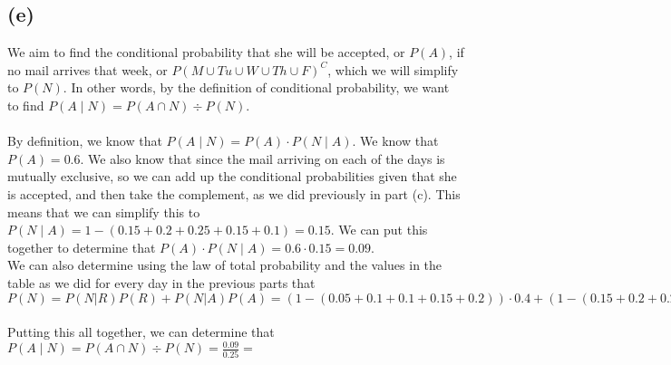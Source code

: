 \documentclass{article}
\begin{document}
{\subsection*{(e)}

We aim to find the conditional probability that she will be accepted, or $P(A)$, if no mail arrives that week, or $P(M \cup Tu \cup W \cup Th \cup F)^C$, which we will simplify to $P(N)$. In other words, by the definition of conditional probability, we want to find $P(A \mid N) = P(A \cap N) \div P(N)$. \\ \\ 
By definition, we know that $P(A \mid N) = P(A) \cdot P(N \mid A)$. We know that $P(A) = 0.6$. We also know that since the mail arriving on each of the days is mutually exclusive, so we can add up the conditional probabilities given that she is accepted, and then take the complement, as we did previously in part (c). This means that we can simplify this to $P(N \mid A) = 1 - (0.15 + 0.2 + 0.25 + 0.15 + 0.1) = 0.15$. We can put this together to determine that $P(A) \cdot P(N \mid A) = 0.6 \cdot 0.15 = 0.09$.\\ 
We can also determine using the law of total probability and the values in the table as we did for every day in the previous parts that $P(N) = P(N|R)P(R) + P(N|A)P(A) = (1 - (0.05 + 0.1 + 0.1 + 0.15 + 0.2)) \cdot 0.4 + (1 - (0.15 + 0.2 + 0.25 + 0.15 + 0.1)) \cdot 0.6 = 0.16 + 0.09 = 0.25$ \\ \\ 
Putting this all together, we can determine that $P(A \mid N) = P(A \cap N) \div P(N) = \frac{0.09}{0.25} = $ 

}
\end{document}

